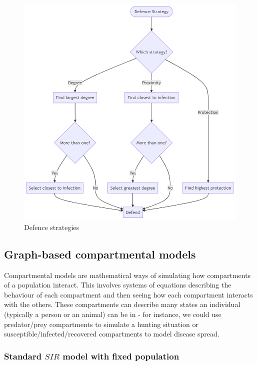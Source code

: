 \documentclass[../report.tex]{subfiles}
\begin{document}
\begin{figure}[ht]
  \centering
  \includegraphics[scale=0.4]{assets/defence}
  \caption{Defence strategies}
  \label{fig:defence}
\end{figure}

\subsection{Graph-based compartmental models}

Compartmental models are mathematical ways of simulating how compartments of a population interact. This involves systems of equations describing the behaviour of each compartment and then seeing how each compartment interacts with the others. These compartments can describe many states an individual (typically a person or an animal) can be in - for instance, we could use predator/prey compartments to simulate a hunting situation or susceptible/infected/recovered compartments to model disease spread.

\subsubsection{Standard $SIR$ model with fixed population}
\end{document}
